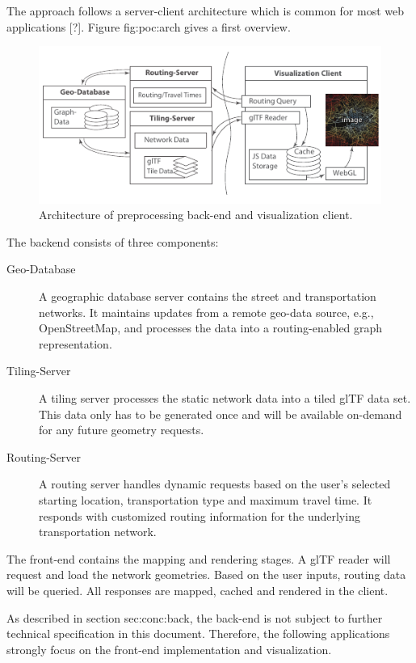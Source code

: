    The approach follows a server-client architecture which is common for most web applications [?]. Figure {fig:poc:arch} gives a first overview.\par
    \begin{figure}[h]
      \centering
      \includegraphics[width=\linewidth]{./img/conceptual-overview-bw.pdf}
      \caption{Architecture of preprocessing back-end and visualization client.}
      \label{fig:poc:arch}
    \end{figure}
    The backend consists of three components:
    \begin{description}
      \item[Geo-Database] A geographic database server contains the street and transportation networks. It maintains updates from a remote geo-data source, e.g., OpenStreetMap, and processes the data into a routing-enabled graph representation.
      \item[Tiling-Server] A tiling server processes the static network data into a tiled glTF data set. This data only has to be generated once and will be available on-demand for any future geometry requests.
      \item[Routing-Server] A routing server handles dynamic requests based on the user's selected starting location, transportation type and maximum travel time. It responds with customized routing information for the underlying transportation network.
    \end{description}
    The front-end contains the mapping and rendering stages. A glTF reader will request and load the network geometries. Based on the user inputs, routing data will be queried. All responses are mapped, cached and rendered in the client.\par
    As described in section {sec:conc:back}, the back-end is not subject to further technical specification in this document. Therefore, the following applications strongly focus on the front-end implementation and visualization.\par
